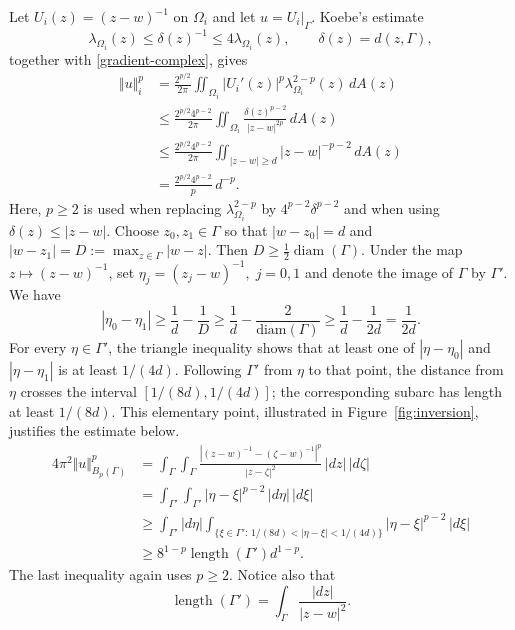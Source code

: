 \documentclass[11pt]{article}
\numberwithin{equation}{section}
\theoremstyle{remark}
\newcommand{\diam}{\operatorname{diam}}
\begin{document}
Let $U_i(z)=(z-w)^{-1}$ on $\Omega_i$ and let $u=U_i|_\Gamma$.
Koebe's estimate
\[
\lambda_{\Omega_i}(z)\le \delta(z)^{-1}
\le4\lambda_{\Omega_i}(z),\qquad
\delta(z)=d(z,\Gamma),
\]
together with \eqref{gradient-complex}, gives
 \begin{align*}
   \Vert u \Vert_i^p
   &= \frac{2^{p/2}}{2\pi}\iint_{\Omega_i}|U_i'(z)|^p
   \lambda_{\Omega_i}^{2-p}(z)\,dA(z)\\
   &\leq \frac{2^{p/2}4^{p-2}}{2\pi}
   \iint_{\Omega_i}\frac{\delta(z)^{p-2}}{|z-w|^{2p}}\,dA(z)\\
   &\leq \frac{2^{p/2}4^{p-2}}{2\pi}
   \iint_{|z-w|\ge d}|z-w|^{-p-2}\,dA(z)\\
   &=\frac{2^{p/2}4^{p-2}}{p}\,d^{-p}.
\end{align*}
Here, $p\ge2$ is used when replacing
$\lambda_{\Omega_i}^{2-p}$ by $4^{p-2}\delta^{p-2}$ and when using
$\delta(z)\le|z-w|$.  Choose $z_0,z_1\in\Gamma$ so that
$|w-z_0|=d$ and $|w-z_1|=D:=\max_{z\in\Gamma}|w-z|$.  Then
$D\ge\frac12\diam(\Gamma)$.  Under the map $z\mapsto(z-w)^{-1}$, set
$\eta_j=(z_j-w)^{-1},\;j=0,1$ and denote the image of $\Gamma$ by $\Gamma'$.
We have
 $$
 |\eta_0 - \eta_1| \geq \frac{1}{d} - \frac{1}{D} \geq \frac{1}{d} - \frac{2}{\text{diam}(\Gamma)} \geq \frac{1}{d} - \frac{1}{2d} = \frac{1}{2d}. 
 $$For every $\eta\in\Gamma'$, the triangle inequality shows that at least
one of $|\eta-\eta_0|$ and $|\eta-\eta_1|$ is at least $1/(4d)$.
Following $\Gamma'$ from $\eta$ to that point, the distance from $\eta$
crosses the interval $[1/(8d),1/(4d)]$; the corresponding subarc has length
at least $1/(8d)$.  This elementary point, illustrated in Figure~\ref{fig:inversion},
justifies the estimate below.
\begin{align*}
    4\pi^2\Vert u \Vert_{B_p(\Gamma)}^p
    &=\int_{\Gamma}\int_{\Gamma}
    \frac{\left|(z-w)^{-1}-(\zeta-w)^{-1}\right|^p}{|z-\zeta|^2}
    \,|dz|\,|d\zeta|\\
    &=\int_{\Gamma'}\int_{\Gamma'}|\eta-\xi|^{p-2}
    \,|d\eta|\,|d\xi|\\
    &\ge \int_{\Gamma'}\!|d\eta|
    \int_{\{\xi\in\Gamma':\,1/(8d)<|\eta-\xi|<1/(4d)\}}
    |\eta-\xi|^{p-2}\,|d\xi|\\
    &\ge 8^{1-p}\operatorname{length}(\Gamma')d^{1-p}.
\end{align*}
The last inequality again uses $p\ge2$.  Notice also that
\begin{equation}\label{length-image}
\operatorname{length}(\Gamma')
=\int_\Gamma\frac{|dz|}{|z-w|^2}.
\end{equation}
\end{document}
